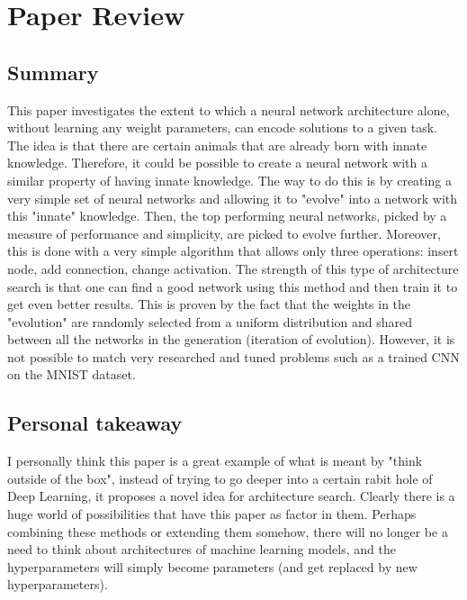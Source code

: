 \documentclass{article}
\begin{document}
\newpage
\section{Paper Review}
\subsection{Summary}
This paper investigates the extent to which a neural network architecture alone, without learning any weight parameters, can encode 
solutions to a given task. The idea is that there are certain animals that are already born with innate knowledge. Therefore, 
it could be possible to create a neural network with a similar property of having innate knowledge. The way to do this is by creating
a very simple set of neural networks and allowing it to "evolve" into a network with this "innate" knowledge. Then, the top performing
neural networks, picked by a measure of performance and simplicity, are picked to evolve further. Moreover, this is done
with a very simple algorithm that allows only three operations: insert node, add connection, change activation. The strength of this
type of architecture search is that one can find a good network using this method and then train it to get even better results. This is
proven by the fact that the weights in the "evolution" are randomly selected from a uniform distribution and shared between all the 
networks in the generation (iteration of evolution).
However, it is not possible to match very researched and tuned problems such as a trained CNN on the MNIST dataset.

\subsection{Personal takeaway}
I personally think this paper is a great example of what is meant by "think outside of the box", instead of trying to go deeper into
a certain rabit hole of Deep Learning, it proposes a novel idea for architecture search. Clearly there is a huge world of possibilities
that have this paper as factor in them. Perhaps combining these methods or extending them somehow, there will no longer be a need to 
think about architectures of machine learning models, and the hyperparameters will simply become parameters (and get replaced by new 
hyperparameters).
\end{document}
